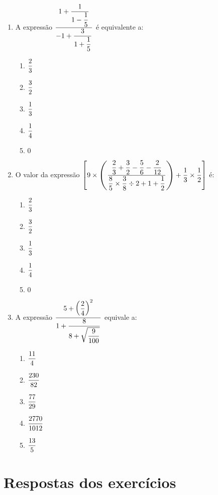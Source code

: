 \begin{enumerate}
		\item A expressão  $\df{1 + \df{1}{1 -\df{1}{5}}}{-1 + \df{3}{1 +\df{1}{5}}}$ é equivalente a:
		\begin{enumerate}
			\item $\df{2}{3}$
			\item $\df{3}{2}$
			\item $\df{1}{3}$
			\item $\df{1}{4}$
			\item $0$
		\end{enumerate}
		
		\item O valor da expressão  $ \left[9 \times \left(\df{\df{2}{3} + \df{3}{2}- \df{5}{6} - \df{2}{12}}{\df{8}{5} \times \df{3}{8} \div 2 + 1 + \df{1}{2}}\right) + \df{1}{3} \times \df{1}{2}\right]$ é:
		\begin{enumerate}
			\item $\df{2}{3}$
			\item $\df{3}{2}$
			\item $\df{1}{3}$
			\item $\df{1}{4}$
			\item $0$
		\end{enumerate}
		
		\item A expressão  $\df{5 + \left(\df{2}{4}\right)^2}{1 + \df{8}{8 + \sqrt{\df{9}{100}}}}$ equivale a:
		\begin{enumerate}
			\item $\df{11}{4}$
			\item $\df{230}{82}$
			\item $\df{77}{29}$
			\item $\df{2770}{1012}$
			\item $\df{13}{5}$
		\end{enumerate}
	\end{enumerate}
	
	\newpage
	
	\section{Respostas dos exercícios}
 
